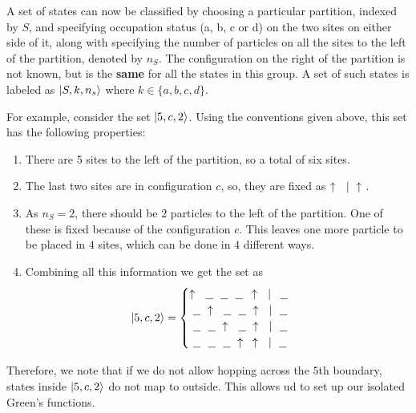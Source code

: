 	A set of states can now be classified by choosing a particular partition, indexed by $ S $, and specifying occupation status (a, b, c or d) on the two sites on either side of it, along with specifying the number of particles on all the sites to the left of the partition, denoted by $ n_S $. The configuration on the right of the partition is not known, but is the \textbf{same} for all the states in this group. A set of such states is labeled as $ \ket{S, k, n_s} $ where $ k \in \{a, b, c, d\} $.
	
	For example, consider the set $ \ket{5,c,2} $. Using the conventions given above, this set has the following properties:
	\begin{enumerate}
		\item There are 5 sites to the left of the partition, so a total of six sites.
		\item The last two sites are in configuration $ c $, so, they are fixed as $ \uparrow\  \ |\  \uparrow\  $.
		\item As $ n_S = 2 $, there should be $ 2 $ particles to the left of the partition. One of these is fixed because of the configuration $ c $. This leaves one more particle to be placed in $ 4 $ sites, which can be done in $ 4 $ different ways.
		\item Combining all this information we get the set as
		\begin{align*}
			\ket{5,c,2} =
			\begin{cases}
				\uparrow\  \ \underline{\ \ }\  \ \underline{\ \ }\  \ \underline{\ \ }\  \,\uparrow\  \ |\ \, \ \underline{\ \ }\  \\
				\ \underline{\ \ }\  \uparrow\  \ \underline{\ \ }\  \ \underline{\ \ }\  \uparrow\  \ |\  \ \underline{\ \ }\  \\
				\ \underline{\ \ }\  \ \underline{\ \ }\  \uparrow\  \ \underline{\ \ }\  \uparrow\  \ |\  \ \underline{\ \ }\  \\
				\ \underline{\ \ }\  \ \underline{\ \ }\  \ \underline{\ \ }\  \uparrow\ \,\,\,\uparrow\  \ |\  \ \underline{\ \ }\  \\
			\end{cases}
		\end{align*}
	\end{enumerate}
	Therefore, we note that if we do not allow hopping across the $ 5 $th boundary, states inside $ \ket{5, c, 2} $ do not map to outside. This allows ud to set up our isolated Green's functions.